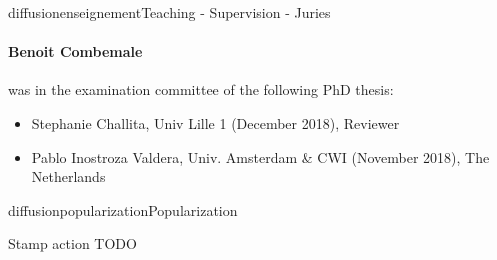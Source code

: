 \documentclass{ra2018}
\begin{document}
\begin{module}{diffusion}{enseignement}{Teaching - Supervision - Juries}
\paragraph*{Benoit Combemale} was in the examination committee of the following PhD thesis: 
\begin{itemize}
	\item Stephanie Challita, Univ Lille 1 (December 2018), Reviewer
	\item Pablo Inostroza Valdera, Univ. Amsterdam \& CWI (November 2018), The Netherlands
\end{itemize}

\end{module}

\begin{module}{diffusion}{popularization}{Popularization}

\begin{description}
	\item Stamp action TODO
	
\end{description}





\end{module}
\end{document}
